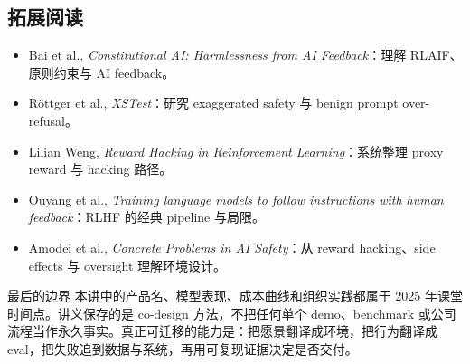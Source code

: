 \subsection{拓展阅读}

\begin{itemize}
  \item Bai et al., \emph{Constitutional AI: Harmlessness from AI Feedback}：理解 RLAIF、原则约束与 AI feedback。
  \item Röttger et al., \emph{XSTest}：研究 exaggerated safety 与 benign prompt over-refusal。
  \item Lilian Weng, \emph{Reward Hacking in Reinforcement Learning}：系统整理 proxy reward 与 hacking 路径。
  \item Ouyang et al., \emph{Training language models to follow instructions with human feedback}：RLHF 的经典 pipeline 与局限。
  \item Amodei et al., \emph{Concrete Problems in AI Safety}：从 reward hacking、side effects 与 oversight 理解环境设计。
\end{itemize}

\begin{warningbox}{最后的边界}
本讲中的产品名、模型表现、成本曲线和组织实践都属于 2025 年课堂时间点。讲义保存的是 co-design 方法，不把任何单个 demo、benchmark 或公司流程当作永久事实。真正可迁移的能力是：把愿景翻译成环境，把行为翻译成 eval，把失败追到数据与系统，再用可复现证据决定是否交付。
\end{warningbox}


